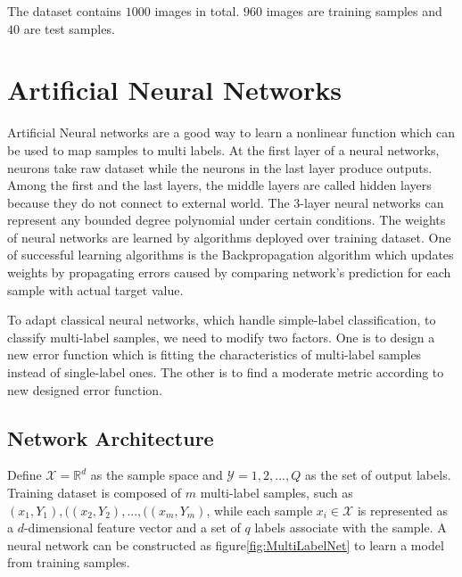 The dataset contains $1000$ images in total. $960$ images are training samples and $40$ are test samples. 

\section{Artificial Neural Networks}

Artificial Neural networks are a good way to learn a nonlinear function which can be used to map samples to multi labels. At the first layer of a neural networks, neurons take raw dataset while the neurons in the last layer produce outputs. Among the first and the last layers, the middle layers are called hidden layers because they do not connect to external world. The 3-layer neural networks can represent any bounded degree polynomial under certain conditions\citep{barron1993universal}. The weights of neural networks are learned by algorithms deployed over training dataset. One of successful learning algorithms is the Backpropagation algorithm which updates weights by propagating errors caused by comparing network's prediction for each sample with actual target value.

To adapt classical neural networks, which handle simple-label classification, to classify multi-label samples, we need to modify two factors. One is to design a new error function which is fitting the characteristics of multi-label samples instead of single-label ones. The other is to find a moderate metric according to new designed error function.

\subsection{Network Architecture}

Define $\mathcal{X} = \mathbb{R}^{d}$ as the sample space and $\mathcal{Y} = {1,2,...,Q}$ as the set of output labels. Training dataset is composed of $m$ multi-label samples, such as ${(x_{1}, Y_{1}),((x_{2}, Y_{2}),...,((x_{m}, Y_{m})}$, while each sample $x_{i} \in \mathcal{X}$ is represented as a $d$-dimensional feature vector and a set of $q$ labels associate with the sample. A neural network can be constructed as figure\ref{fig:MultiLabelNet} to learn a model from training samples.

